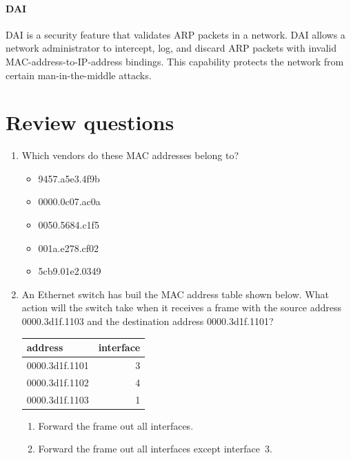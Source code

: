 \paragraph{\acl{DAI}}
\Acf{DAI} is a security feature that validates \acs{ARP} packets in a network.
\Acl{DAI} allows a network administrator to intercept, log, and discard \ac{ARP} packets with invalid \acs{MAC}-address-to-\acs{IP}-address bindings.
This capability protects the network from certain man-in-the-middle attacks.


\section{Review questions}
\label{sec:ethernet-review-questions}
\begin{enumerate}
\item Which vendors do these \acs{MAC} addresses belong to?
   \begin{itemize}
   \item 9457.a5e3.4f9b
   \item 0000.0c07.ac0a
   \item 0050.5684.c1f5
   \item 001a.e278.cf02
   \item 5cb9.01e2.0349
   \end{itemize}
\item
   An Ethernet switch has buil the \acs{MAC} address table shown below.
   What action will the switch take when it receives a frame with the source address 0000.3d1f.1103 and the destination address 0000.3d1f.1101?
   \begin{center}
   \begin{tabular}{lr}
   address & interface \\
   \midrule
   0000.3d1f.1101 & 3 \\
   0000.3d1f.1102 & 4 \\
   0000.3d1f.1103 & 1 \\
   \end{tabular}
   \end{center}
   \begin{enumerate}
   \item Forward the frame out all interfaces.
   \item Forward the frame out all interfaces except interface~3.

\end{enumerate}
\end{enumerate}
